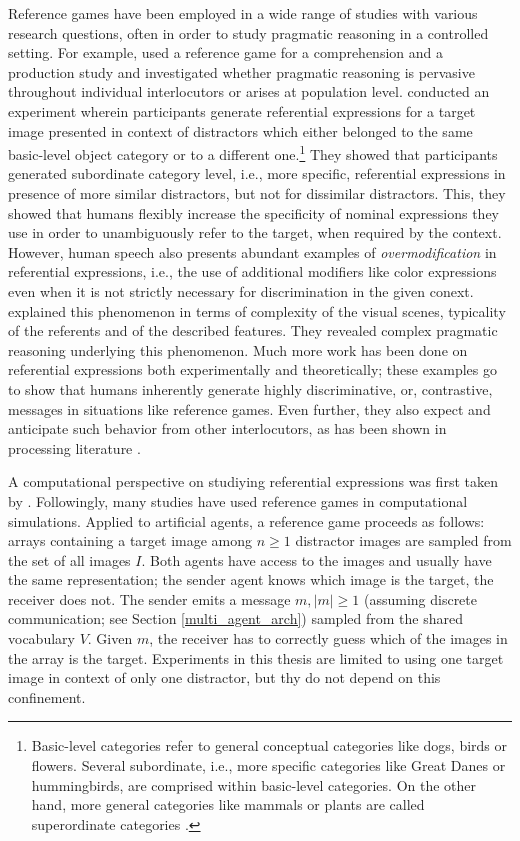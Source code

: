 Reference games have been employed in a wide range of studies with various research questions, often in order to study pragmatic reasoning in a controlled setting. For example, \cite{franke2016reasoning} used a reference game for a comprehension and a production study and investigated whether pragmatic reasoning is pervasive throughout individual interlocutors or arises at population level. \cite{graf2016animal} conducted an experiment wherein participants generate referential expressions for a target image presented in context of distractors which either belonged to the same basic-level object category or to a different one.\footnote{Basic-level categories refer to general conceptual categories like dogs, birds or flowers. Several subordinate, i.e., more specific categories like Great Danes or hummingbirds, are comprised within basic-level categories. On the other hand, more general categories like mammals or plants are called superordinate categories \parencite{rosch1976basic}.} They showed that participants generated subordinate category level, i.e., more specific, referential expressions in presence of more similar distractors, but not for dissimilar distractors. This, they showed that humans flexibly increase the specificity of nominal expressions they use in order to unambiguously refer to the target, when required by the context. However, human speech also presents abundant examples of \textit{overmodification} in referential expressions, i.e., the use of additional modifiers like color expressions even when it is not strictly necessary for discrimination in the given conext. \cite{degen2020redundancy} explained this phenomenon in terms of complexity of the visual scenes, typicality of the referents and of the described features. They revealed complex pragmatic reasoning underlying this phenomenon. Much more work has been done on referential expressions both experimentally and theoretically; these examples go to show that humans inherently generate highly discriminative, or, contrastive, messages in situations like reference games. Even further, they also expect and anticipate such behavior from other interlocutors, as has been shown in processing literature \parencite[e. g., cf.]{sedivy1999achieving}.

A computational perspective on studiying referential expressions was first taken by \cite{dale1995computational}. Followingly, many studies have used reference games in computational simulations. Applied to artificial agents, a reference game proceeds as follows: arrays containing a target image among $n \geq 1$ distractor images are sampled from the set of all images $I$. Both agents have access to the images and usually have the same representation; the sender agent knows which image is the target, the receiver does not. The sender emits a message $m, |m| \geq 1$ (assuming discrete communication; see Section \ref{multi_agent_arch}) sampled from the shared vocabulary $V$. Given $m$, the receiver has to correctly guess which of the images in the array is the target. Experiments in this thesis are limited to using one target image in context of only one distractor, but thy do not depend on this confinement.

